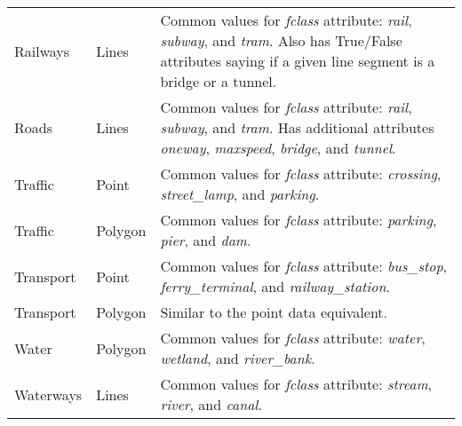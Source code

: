 \begin{longtable}{p{3cm}p{2.3cm}p{8cm}}
    Railways           & Lines              & Common values for \emph{fclass} attribute: \emph{rail}, \emph{subway}, and \emph{tram}. Also has True/False attributes saying if a given line segment is a bridge or a tunnel.      \\
    Roads              & Lines              & Common values for \emph{fclass} attribute: \emph{rail}, \emph{subway}, and \emph{tram}. Has additional attributes \emph{oneway}, \emph{maxspeed}, \emph{bridge}, and \emph{tunnel}. \\
    Traffic            & Point              & Common values for \emph{fclass} attribute: \emph{crossing}, \emph{street\_lamp}, and \emph{parking}.                                                                                \\
    Traffic            & Polygon            & Common values for \emph{fclass} attribute: \emph{parking}, \emph{pier}, and \emph{dam}.                                                                                             \\
    Transport          & Point              & Common values for \emph{fclass} attribute: \emph{bus\_stop}, \emph{ferry\_terminal}, and \emph{railway\_station}.                                                                   \\
    Transport          & Polygon            & Similar to the point data equivalent.                                                                                                                                               \\
    Water              & Polygon            & Common values for \emph{fclass} attribute: \emph{water}, \emph{wetland}, and \emph{river\_bank}.                                                                                    \\
    Waterways          & Lines              & Common values for \emph{fclass} attribute: \emph{stream}, \emph{river}, and \emph{canal}.                                                                                           \\
\end{longtable}